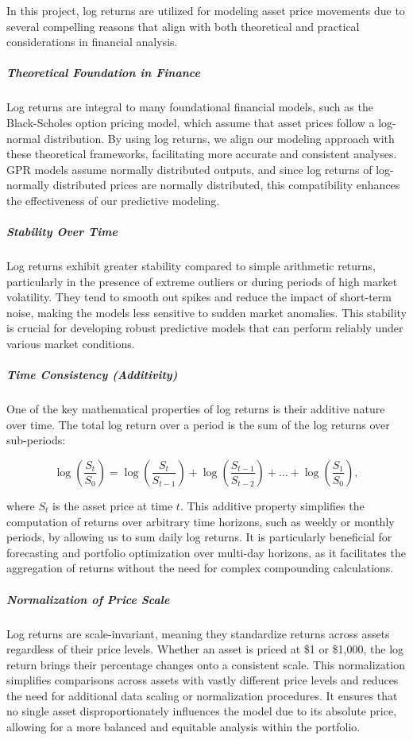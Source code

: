 In this project, log returns are utilized for modeling asset price movements due to several compelling reasons that align with both theoretical and practical considerations in financial analysis.

\subparagraph{Theoretical Foundation in Finance}

Log returns are integral to many foundational financial models, such as the Black-Scholes option pricing model, which assume that asset prices follow a log-normal distribution. By using log returns, we align our modeling approach with these theoretical frameworks, facilitating more accurate and consistent analyses. \ac{GPR} models assume normally distributed outputs, and since log returns of log-normally distributed prices are normally distributed, this compatibility enhances the effectiveness of our predictive modeling.

\subparagraph{Stability Over Time}

Log returns exhibit greater stability compared to simple arithmetic returns, particularly in the presence of extreme outliers or during periods of high market volatility. They tend to smooth out spikes and reduce the impact of short-term noise, making the models less sensitive to sudden market anomalies. This stability is crucial for developing robust predictive models that can perform reliably under various market conditions.

\subparagraph{Time Consistency (Additivity)}

One of the key mathematical properties of log returns is their additive nature over time. The total log return over a period is the sum of the log returns over sub-periods:

\begin{equation}
\log\left( \frac{S_t}{S_0} \right) = \log\left( \frac{S_t}{S_{t-1}} \right) + \log\left( \frac{S_{t-1}}{S_{t-2}} \right) + \dots + \log\left( \frac{S_1}{S_0} \right),
\end{equation}

where $S_t$ is the asset price at time $t$. This additive property simplifies the computation of returns over arbitrary time horizons, such as weekly or monthly periods, by allowing us to sum daily log returns. It is particularly beneficial for forecasting and portfolio optimization over multi-day horizons, as it facilitates the aggregation of returns without the need for complex compounding calculations.

\subparagraph{Normalization of Price Scale}

Log returns are scale-invariant, meaning they standardize returns across assets regardless of their price levels. Whether an asset is priced at \$1 or \$1,000, the log return brings their percentage changes onto a consistent scale. This normalization simplifies comparisons across assets with vastly different price levels and reduces the need for additional data scaling or normalization procedures. It ensures that no single asset disproportionately influences the model due to its absolute price, allowing for a more balanced and equitable analysis within the portfolio.


